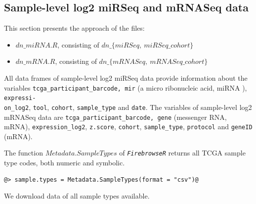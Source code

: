 \documentclass{TechReport}
\begin{document}
\subsection{Sample-level log2 miRSeq and mRNASeq data}
This section presents the approach of the files:
\begin{itemize}
\item $dn\_miRNA.R$, consisting of $dn\_\{miRSeq,\ miRSeq\_cohort\}$
\item $dn\_mRNA.R$, consisting of $dn\_\{mRNASeq,\ mRNASeq\_cohort\}$
\end{itemize}

All data frames of sample-level log2 miRSeq data provide information
about the variables {\tt tcga\_participant\_barcode, mir} (a
micro ribonucleic acid, miRNA ), {\tt expressi-\\ on\_log2}, {\tt tool},
{\tt cohort}, {\tt sample\_type} and {\tt date}. The variables of
sample-level log2 mRNASeq data are {\tt tcga\_participant\_barcode,
  gene} (messenger RNA, mRNA), {\tt expression\_log2}, {\tt z.score},
{\tt cohort}, {\tt sample\_type},
{\tt protocol} and {\tt geneID} (mRNA).

The function $Metadata.SampleTypes$ of \texttt{\em FirebrowseR}
returns all TCGA sample type codes, both numeric and symbolic.
\begin{lstlisting}[style=base]
@> sample.types = Metadata.SampleTypes(format = "csv")@
 \end{lstlisting}
 We download data of all sample types available.
 
\end{document}
